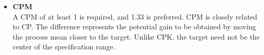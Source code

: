 \documentclass[SPC-MASTER.tex]{subfiles}
\begin{document}
{\begin{itemize}
\item\textbf{ CPM}\\
A CPM of at least 1 is required, and 1.33 is preferred. CPM is closely related to CP. The difference represents the potential gain to be obtained by moving the process mean closer to the target. Unlike CPK, the target need not be the center of the specification range.
\end{itemize}
\newpage
}
\newpage
\end{document}

